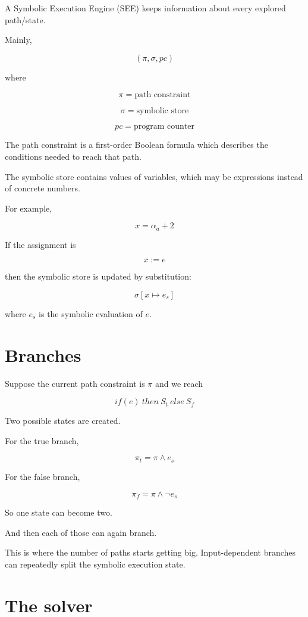 \documentclass[11pt]{book}
\begin{document}
A Symbolic Execution Engine (SEE) keeps information
about every explored path/state.

Mainly,

\[
(\pi,\sigma,pc)
\]

where

\[
\pi = \text{path constraint}
\]

\[
\sigma = \text{symbolic store}
\]

\[
pc = \text{program counter}
\]

\begin{ppdefn}
The path constraint is a first-order Boolean formula
which describes the conditions needed to reach that path.

The symbolic store contains values of variables, which
may be expressions instead of concrete numbers.
\end{ppdefn}

For example,

\[
x = \alpha_a + 2
\]

If the assignment is

\[
x := e
\]

then the symbolic store is updated by substitution:

\[
\sigma[x\mapsto e_s]
\]

where $e_s$ is the symbolic evaluation of $e$.

\section{Branches}

Suppose the current path constraint is $\pi$ and we reach

\[
if(e)\ then\ S_t\ else\ S_f
\]

Two possible states are created.

For the true branch,

\[
\pi_t = \pi \land e_s
\]

For the false branch,

\[
\pi_f = \pi \land \neg e_s
\]

So one state can become two.

And then each of those can again branch.

\begin{ppnote}
This is where the number of paths starts getting big.
Input-dependent branches can repeatedly split the
symbolic execution state.
\end{ppnote}

\section{The solver}
\end{document}
